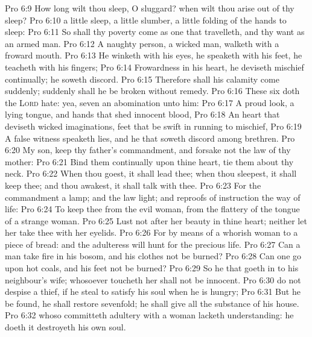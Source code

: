 \vs Pro 6:9 How long wilt thou sleep, O sluggard? when wilt thou arise out of thy sleep?
\vs Pro 6:10  a little sleep, a little slumber, a little folding of the hands to sleep:
\vs Pro 6:11 So shall thy poverty come as one that travelleth, and thy want as an armed man.
\vs Pro 6:12 A naughty person, a wicked man, walketh with a froward mouth.
\vs Pro 6:13 He winketh with his eyes, he speaketh with his feet, he teacheth with his fingers;
\vs Pro 6:14 Frowardness  in his heart, he deviseth mischief continually; he soweth discord.
\vs Pro 6:15 Therefore shall his calamity come suddenly; suddenly shall he be broken without remedy.
\vs Pro 6:16 These six  doth the \textsc{Lord} hate: yea, seven  an abomination unto him:
\vs Pro 6:17 A proud look, a lying tongue, and hands that shed innocent blood,
\vs Pro 6:18 An heart that deviseth wicked imaginations, feet that be swift in running to mischief,
\vs Pro 6:19 A false witness  speaketh lies, and he that soweth discord among brethren.
\vs Pro 6:20 My son, keep thy father's commandment, and forsake not the law of thy mother:
\vs Pro 6:21 Bind them continually upon thine heart,  tie them about thy neck.
\vs Pro 6:22 When thou goest, it shall lead thee; when thou sleepest, it shall keep thee; and  thou awakest, it shall talk with thee.
\vs Pro 6:23 For the commandment  a lamp; and the law  light; and reproofs of instruction  the way of life:
\vs Pro 6:24 To keep thee from the evil woman, from the flattery of the tongue of a strange woman.
\vs Pro 6:25 Lust not after her beauty in thine heart; neither let her take thee with her eyelids.
\vs Pro 6:26 For by means of a whorish woman  to a piece of bread: and the adulteress will hunt for the precious life.
\vs Pro 6:27 Can a man take fire in his bosom, and his clothes not be burned?
\vs Pro 6:28 Can one go upon hot coals, and his feet not be burned?
\vs Pro 6:29 So he that goeth in to his neighbour's wife; whosoever toucheth her shall not be innocent.
\vs Pro 6:30  do not despise a thief, if he steal to satisfy his soul when he is hungry;
\vs Pro 6:31 But  he be found, he shall restore sevenfold; he shall give all the substance of his house.
\vs Pro 6:32  whoso committeth adultery with a woman lacketh understanding: he  doeth it destroyeth his own soul.
